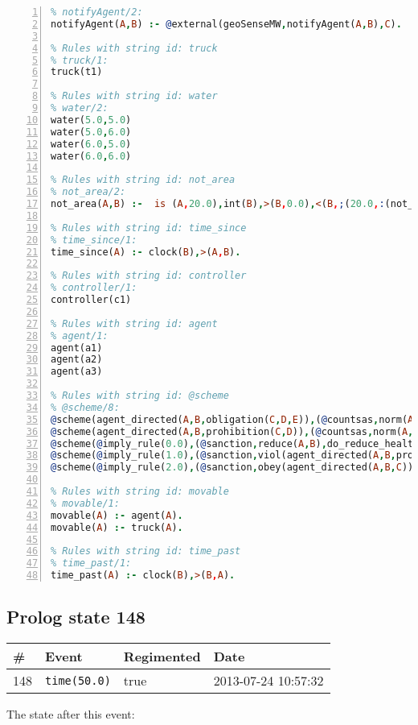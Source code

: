 \documentclass[11pt]{article}\usepackage[utf8]{inputenc}\usepackage{geometry}
\begin{document}
\begin{lstlisting}[language=Prolog, numbers=left]
% Rules with string id: notifyAgent
% notifyAgent/2:
notifyAgent(A,B) :- @external(geoSenseMW,notifyAgent(A,B),C).

% Rules with string id: truck
% truck/1:
truck(t1)

% Rules with string id: water
% water/2:
water(5.0,5.0)
water(5.0,6.0)
water(6.0,5.0)
water(6.0,6.0)

% Rules with string id: not_area
% not_area/2:
not_area(A,B) :-  is (A,20.0),int(B),>(B,0.0),<(B,;(20.0,:(not_area(A,B), is (-(B),20.0)))),int(A),>(A,0.0),<(A,;(20.0,:(area(A,B),-(int(A))))),int(B),>(A,0.0),>(B,0.0),<(A,21.0),<(B,21.0).

% Rules with string id: time_since
% time_since/1:
time_since(A) :- clock(B),>(A,B).

% Rules with string id: controller
% controller/1:
controller(c1)

% Rules with string id: agent
% agent/1:
agent(a1)
agent(a2)
agent(a3)

% Rules with string id: @scheme
% @scheme/8:
@scheme(agent_directed(A,B,obligation(C,D,E)),(@countsas,norm(A,B,F,obligation(C,D,E)),F),false,(listTrue(C)),(time_past(D)),false,[plus(viol(agent_directed(A,B,obligation(C,D,E))))|[]],[plus(obey(agent_directed(A,B,obligation(C,D,E))))|[]])
@scheme(agent_directed(A,B,prohibition(C,D)),(@countsas,norm(A,B,E,prohibition(C,D)),E),(listTrue(C)),false,(false),false,[plus(viol(agent_directed(A,B,prohibition(C,D))))|[]],[plus(obey(agent_directed(A,B,prohibition(C,D))))|[]])
@scheme(@imply_rule(0.0),(@sanction,reduce(A,B),do_reduce_health(A,B),notifyAgent(A,changed(status))),true,false,false,false,[min(reduce(A,B))|[]],[])
@scheme(@imply_rule(1.0),(@sanction,viol(agent_directed(A,B,prohibition(C,D))),do_sanction(D)),true,false,false,false,[min(viol(agent_directed(A,B,prohibition(C,D))))|[]],[])
@scheme(@imply_rule(2.0),(@sanction,obey(agent_directed(A,B,C))),true,false,false,false,[min(obey(agent_directed(A,B,C)))|[]],[])

% Rules with string id: movable
% movable/1:
movable(A) :- agent(A).
movable(A) :- truck(A).

% Rules with string id: time_past
% time_past/1:
time_past(A) :- clock(B),>(B,A).

\end{lstlisting}
\clearpage 
\subsection{Prolog state 148}
\begin{table}[ht]
\centering 
\begin{tabular}{l l l l} 
\textbf{\#} & \textbf{Event} & \textbf{Regimented} & \textbf{Date} \\ [0.5ex] 
\hline
148&\texttt{time(50.0)}&true&2013-07-24 10:57:32\\ [1ex] \hline\end{tabular}
\end{table}
The state after this event:
\end{document}
